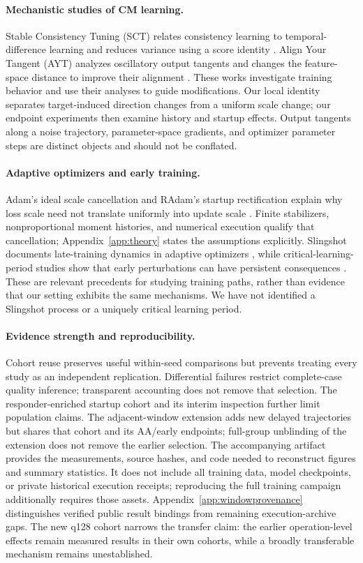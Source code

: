 \paragraph{Mechanistic studies of CM learning.}
Stable Consistency Tuning (SCT) relates consistency learning to temporal-difference learning and reduces variance using a score identity \citep{wang2024sct}. Align Your Tangent (AYT) analyzes oscillatory output tangents and changes the feature-space distance to improve their alignment \citep{kim2025ayt}. These works investigate training behavior and use their analyses to guide modifications. Our local identity separates target-induced direction changes from a uniform scale change; our endpoint experiments then examine history and startup effects. Output tangents along a noise trajectory, parameter-space gradients, and optimizer parameter steps are distinct objects and should not be conflated.

\paragraph{Adaptive optimizers and early training.}
Adam's ideal scale cancellation and RAdam's startup rectification explain why loss scale need not translate uniformly into update scale \citep{kingma2015adam,liu2020radam}. Finite stabilizers, nonproportional moment histories, and numerical execution qualify that cancellation; Appendix~\ref{app:theory} states the assumptions explicitly. Slingshot documents late-training dynamics in adaptive optimizers \citep{thilak2022slingshot}, while critical-learning-period studies show that early perturbations can have persistent consequences \citep{achille2019critical}. These are relevant precedents for studying training paths, rather than evidence that our setting exhibits the same mechanisms. We have not identified a Slingshot process or a uniquely critical learning period.

\paragraph{Evidence strength and reproducibility.}
Cohort reuse preserves useful within-seed comparisons but prevents treating every study as an independent replication. Differential failures restrict complete-case quality inference; transparent accounting does not remove that selection. The responder-enriched startup cohort and its interim inspection further limit population claims. The adjacent-window extension adds new delayed trajectories but shares that cohort and its AA/early endpoints; full-group unblinding of the extension does not remove the earlier selection. The accompanying artifact provides the measurements, source hashes, and code needed to reconstruct figures and summary statistics. It does not include all training data, model checkpoints, or private historical execution receipts; reproducing the full training campaign additionally requires those assets. Appendix~\ref{app:windowprovenance} distinguishes verified public result bindings from remaining execution-archive gaps. The new q128 cohort narrows the transfer claim: the earlier operation-level effects remain measured results in their own cohorts, while a broadly transferable mechanism remains unestablished.

